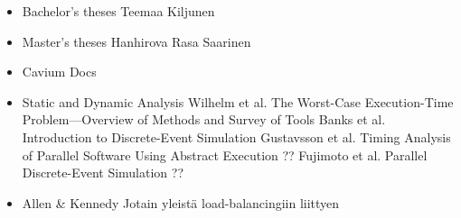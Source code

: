 \begin{itemize}
\item Bachelor's theses
  \subitem Teemaa
  \subitem Kiljunen
\item Master's theses
  \subitem Hanhirova
  \subitem Rasa
  \subitem Saarinen
\item Cavium Docs
\item Static and Dynamic Analysis
  \subitem Wilhelm et al. The Worst-Case Execution-Time Problem—Overview of Methods and Survey of Tools
  \subitem Banks et al. Introduction to Discrete-Event Simulation
  \subitem Gustavsson et al. Timing Analysis of Parallel Software Using Abstract Execution ??
  \subitem Fujimoto et al. Parallel Discrete-Event Simulation ??
\item Allen \& Kennedy Jotain yleistä load-balancingiin liittyen

\end{itemize}

